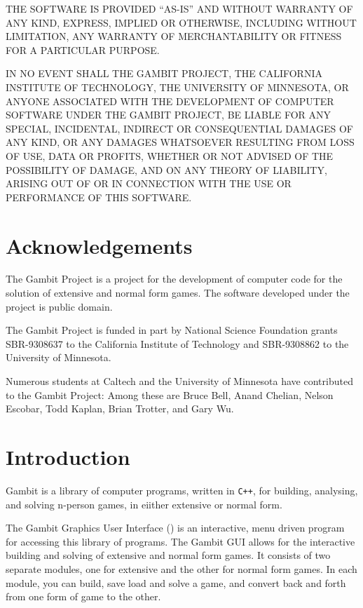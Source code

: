 THE SOFTWARE IS PROVIDED ``AS-IS'' AND WITHOUT WARRANTY OF ANY KIND, EXPRESS, IMPLIED OR 
OTHERWISE, INCLUDING WITHOUT LIMITATION, ANY WARRANTY OF MERCHANTABILITY OR FITNESS FOR A 
PARTICULAR PURPOSE.
 
IN NO EVENT SHALL THE GAMBIT PROJECT, THE CALIFORNIA INSTITUTE OF TECHNOLOGY, THE UNIVERSITY 
OF MINNESOTA, OR ANYONE ASSOCIATED WITH THE DEVELOPMENT OF COMPUTER SOFTWARE UNDER THE GAMBIT 
PROJECT, BE LIABLE FOR ANY SPECIAL, INCIDENTAL, INDIRECT OR CONSEQUENTIAL DAMAGES OF ANY KIND, 
OR ANY DAMAGES WHATSOEVER RESULTING FROM LOSS OF USE, DATA OR PROFITS, WHETHER OR NOT ADVISED 
OF THE POSSIBILITY OF DAMAGE, AND ON ANY THEORY OF LIABILITY, ARISING OUT OF OR IN CONNECTION 
WITH THE USE OR PERFORMANCE OF THIS SOFTWARE.


\chapter*{Acknowledgements}%

The Gambit Project is a project for the development of computer code for the 
solution of extensive and normal form games.  The software developed under 
the project is public domain.  

The Gambit Project is funded in part by 
National Science Foundation grants SBR-9308637 to the California Institute 
of Technology and SBR-9308862 to the University of Minnesota.  

Numerous students at Caltech and the University of Minnesota have contributed
 to the Gambit Project:  Among these are Bruce Bell,  Anand Chelian, Nelson 
Escobar, Todd Kaplan, Brian Trotter, and Gary Wu. 

\chapter{Introduction} 
Gambit is a library of computer programs, written
in \verb$C++$, for building, analysing, and solving n-person games, in
eiither extensive or normal form.

The Gambit Graphics User Interface () is an
interactive, menu driven program for accessing this library of programs.
The Gambit GUI allows for the interactive building and solving of
extensive and normal form games.  It consists of two separate modules, one
for extensive and the other for normal form games.   In each module, you
can build, save load and solve a game, and convert back and forth from one
form of game to the other.

